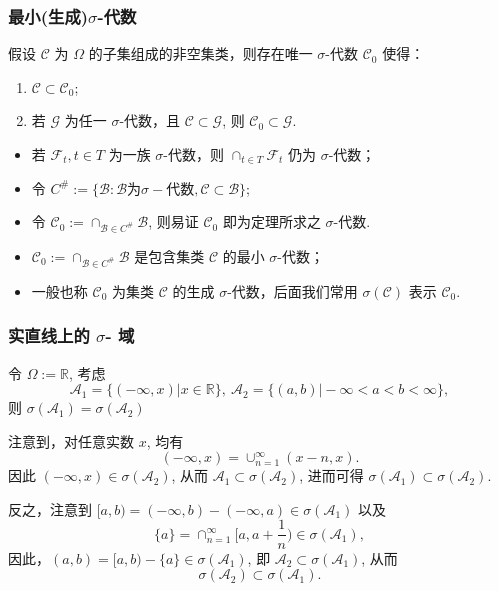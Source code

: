 \begin{frame}
	\frametitle{最小(生成)$\sigma$-代数}
	\begin{thm}
		假设 $\mathcal{C}$ 为 $\Omega$ 的子集组成的非空集类，则存在唯一 $\sigma$-代数 $\mathcal{C}_0$ 使得：
		\begin{enumerate}[<+-|alert@+>][(1)]
			\item $\mathcal{C}\subset \mathcal{C}_0$;
			\item 若 $\mathcal{G}$ 为任一 $\sigma$-代数，且 $\mathcal{C}\subset \mathcal{G}$, 则 $\mathcal{C}_0\subset \mathcal{G}$.
		\end{enumerate}
	\end{thm}

	\pause
	\zheng
	\begin{itemize}[<+-|alert@+>]
		\item 若 $\mathcal{F}_t, t\in T$ 为一族 $\sigma$-代数，则 $\cap_{t\in T}\mathcal{F}_t$ 仍为 $\sigma$-代数；
		\item 令 $C^{\#}:=\{\mathcal{B}:\mathcal{B}\mbox{为}\sigma-\mbox{代数}, \mathcal{C}\subset \mathcal{B}\}$;

		\item 令 $\mathcal{C}_0:=\cap_{\mathcal{B}\in C^{\#}}\mathcal{B}$, 则易证 $\mathcal{C}_0$ 即为定理所求之 $\sigma$-代数.
	\end{itemize}

	\pause
	\begin{rmk}
		\begin{itemize}[<+-|alert@+>]
			\item $\mathcal{C}_0:=\cap_{\mathcal{B}\in C^{\#}}\mathcal{B}$ 是包含集类 $\mathcal{C}$ 的最小 $\sigma$-代数；
			\item 一般也称 $\mathcal{C}_0$ 为集类 $\mathcal{C}$ 的生成 $\sigma$-代数，后面我们常用 $\sigma (\mathcal{C})$ 表示 $\mathcal{C}_0$.
		\end{itemize}
	\end{rmk}
\end{frame}
\begin{frame}
	\frametitle{实直线上的 $\sigma$- 域}
	\begin{exam}
		令 $\Omega:=\mathbb{R}$, 考虑
		\[\mathcal{A}_1=\{(-\infty, x)|x\in\mathbb{R}\}, \  \mathcal{A}_2=\{(a, b)|-\infty<a<b<\infty\},\]
		则 $\sigma (\mathcal{A}_1)=\sigma (\mathcal{A}_2)$
	\end{exam}

	\pause
	\jieda  注意到，对任意实数 $x$, 均有
	\[(-\infty, x)=\cup_{n=1}^\infty(x-n,x).\]
	\pause 因此 $(-\infty, x)\in\sigma (\mathcal{A}_2)$, \pause 从而 $\mathcal{A}_1\subset \sigma (\mathcal{A}_2)$, \pause 进而可得 $\sigma (\mathcal{A}_1)\subset\sigma (\mathcal{A}_2)$.

	\pause 反之，注意到 $[a,b)=(-\infty, b)-(-\infty,a)\in\sigma (\mathcal{A}_1)$ 以及
	\[\{a\}=\cap_{n=1}^\infty[a,a+\dfrac{1}{n})\in\sigma(\mathcal{A}_1),\]
	\pause 因此，$(a,b)=[a,b)-\{a\}\in\sigma (\mathcal{A}_1)$, \pause 即 $\mathcal{A}_2\subset\sigma (\mathcal{A}_1)$, \pause 从而
	\[\sigma(\mathcal{A}_2)\subset \sigma(\mathcal{A}_1).\]
\end{frame}


